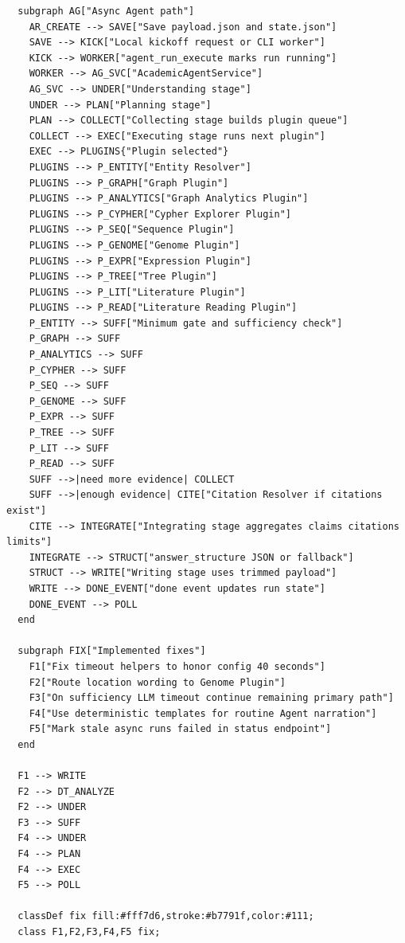 \documentclass[UTF8]{ctexart}
\begin{document}
\begin{verbatim}
  subgraph AG["Async Agent path"]
    AR_CREATE --> SAVE["Save payload.json and state.json"]
    SAVE --> KICK["Local kickoff request or CLI worker"]
    KICK --> WORKER["agent_run_execute marks run running"]
    WORKER --> AG_SVC["AcademicAgentService"]
    AG_SVC --> UNDER["Understanding stage"]
    UNDER --> PLAN["Planning stage"]
    PLAN --> COLLECT["Collecting stage builds plugin queue"]
    COLLECT --> EXEC["Executing stage runs next plugin"]
    EXEC --> PLUGINS{"Plugin selected"}
    PLUGINS --> P_ENTITY["Entity Resolver"]
    PLUGINS --> P_GRAPH["Graph Plugin"]
    PLUGINS --> P_ANALYTICS["Graph Analytics Plugin"]
    PLUGINS --> P_CYPHER["Cypher Explorer Plugin"]
    PLUGINS --> P_SEQ["Sequence Plugin"]
    PLUGINS --> P_GENOME["Genome Plugin"]
    PLUGINS --> P_EXPR["Expression Plugin"]
    PLUGINS --> P_TREE["Tree Plugin"]
    PLUGINS --> P_LIT["Literature Plugin"]
    PLUGINS --> P_READ["Literature Reading Plugin"]
    P_ENTITY --> SUFF["Minimum gate and sufficiency check"]
    P_GRAPH --> SUFF
    P_ANALYTICS --> SUFF
    P_CYPHER --> SUFF
    P_SEQ --> SUFF
    P_GENOME --> SUFF
    P_EXPR --> SUFF
    P_TREE --> SUFF
    P_LIT --> SUFF
    P_READ --> SUFF
    SUFF -->|need more evidence| COLLECT
    SUFF -->|enough evidence| CITE["Citation Resolver if citations exist"]
    CITE --> INTEGRATE["Integrating stage aggregates claims citations limits"]
    INTEGRATE --> STRUCT["answer_structure JSON or fallback"]
    STRUCT --> WRITE["Writing stage uses trimmed payload"]
    WRITE --> DONE_EVENT["done event updates run state"]
    DONE_EVENT --> POLL
  end

  subgraph FIX["Implemented fixes"]
    F1["Fix timeout helpers to honor config 40 seconds"]
    F2["Route location wording to Genome Plugin"]
    F3["On sufficiency LLM timeout continue remaining primary path"]
    F4["Use deterministic templates for routine Agent narration"]
    F5["Mark stale async runs failed in status endpoint"]
  end

  F1 --> WRITE
  F2 --> DT_ANALYZE
  F2 --> UNDER
  F3 --> SUFF
  F4 --> UNDER
  F4 --> PLAN
  F4 --> EXEC
  F5 --> POLL

  classDef fix fill:#fff7d6,stroke:#b7791f,color:#111;
  class F1,F2,F3,F4,F5 fix;
\end{verbatim}
\end{document}
